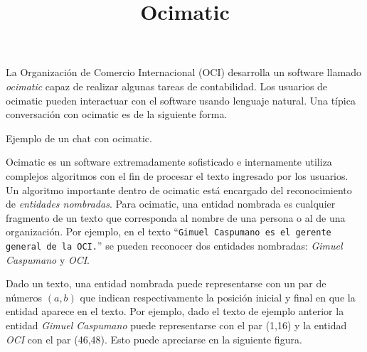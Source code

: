 \documentclass{oci}
\title{Ocimatic}
\begin{document}
\begin{problemDescription}
La Organización de Comercio Internacional (OCI) desarrolla un software llamado
\emph{ocimatic} capaz de realizar algunas tareas de contabilidad.
Los usuarios de ocimatic pueden interactuar con el software usando lenguaje
natural.
Una típica conversación con ocimatic es de la siguiente forma.

\begin{center}
  Ejemplo de un chat con ocimatic.
\end{center}

Ocimatic es un software extremadamente sofisticado e internamente utiliza
complejos algoritmos con el fin de procesar el texto ingresado por los usuarios.
Un algoritmo importante dentro de ocimatic está encargado del reconocimiento de
\emph{entidades nombradas}.
Para ocimatic, una entidad nombrada es cualquier fragmento de un texto que
corresponda al nombre de una persona o al de una organización.
Por ejemplo, en el texto ``\texttt{Gimuel Caspumano es el gerente general
  de la OCI.}''
se pueden reconocer dos entidades nombradas: \emph{Gimuel Caspumano} y \emph{OCI}.

Dado un texto, una entidad nombrada puede representarse con un par de números
$(a,b)$ que indican respectivamente la posición inicial y final en que la
entidad aparece en el texto.
Por ejemplo, dado el texto de ejemplo anterior la entidad \emph{Gimuel Caspumano}
puede representarse con el par (1,16) y la entidad \emph{OCI} con el par
(46,48).
Esto puede apreciarse en la siguiente figura.


\end{problemDescription}
\end{document}
